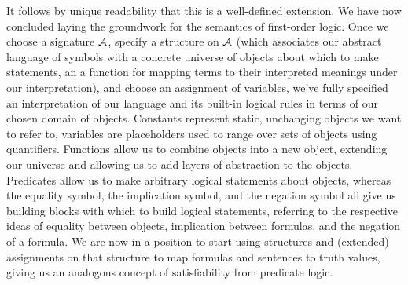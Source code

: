 \documentclass{article}
\begin{document}
\n
It follows by unique readability that this is a well-defined extension. We have now concluded laying the groundwork for the semantics of first-order logic. Once we choose a signature $ \mathcal{A} $, specify a structure on $ \mathcal{A} $ (which associates our abstract language of symbols with a concrete universe of objects about which to make statements, an a function for mapping terms to their interpreted meanings under our interpretation), and choose an assignment of variables, we've fully specified an interpretation of our language and its built-in logical rules in terms of our chosen domain of objects. Constants represent static, unchanging objects we want to refer to, variables are placeholders used to range over sets of objects using quantifiers. Functions allow us to combine objects into a new object, extending our universe and allowing us to add layers of abstraction to the objects. Predicates allow us to make arbitrary logical statements about objects, whereas the equality symbol, the implication symbol, and the negation symbol all give us building blocks with which to build logical statements, referring to the respective ideas of equality between objects, implication between formulas, and the negation of a formula. We are now in a position to start using structures and (extended) assignments on that structure to map formulas and sentences to truth values, giving us an analogous concept of satisfiability from predicate logic.
\end{document}
